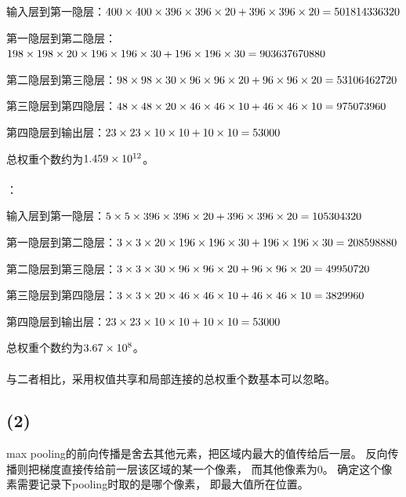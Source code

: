 \documentclass{article}
\renewcommand{\part}[1]{\subsection*{(#1)}}
\begin{document}
输入层到第一隐层：${\rm{400}} \times {\rm{400}} \times {\rm{396}} \times {\rm{396}} \times {\rm{20 + 396}} \times {\rm{396}} \times {\rm{20 = 501814336320}}$

第一隐层到第二隐层：${\rm{198}} \times {\rm{198}} \times {\rm{20}} \times {\rm{196}} \times {\rm{196}} \times {\rm{30 + 196}} \times {\rm{196}} \times {\rm{30 = 903637670880}}$

第二隐层到第三隐层：${\rm{98}} \times {\rm{98}} \times {\rm{30}} \times {\rm{96}} \times {\rm{96}} \times {\rm{20 + 96}} \times {\rm{96}} \times {\rm{20 = 53106462720}}$

第三隐层到第四隐层：${\rm{48}} \times {\rm{48}} \times {\rm{20}} \times {\rm{46}} \times {\rm{46}} \times {\rm{10 + 46}} \times {\rm{46}} \times {\rm{10 = 975073960}}$

第四隐层到输出层：${\rm{23}} \times {\rm{23}} \times {\rm{10}} \times {\rm{10 + 10}} \times {\rm{10 = 53000}}$

总权重个数约为${\rm{1}}{\rm{.459}} \times {\rm{1}}{{\rm{0}}^{{\rm{12}}}}$。
\\\\
：

输入层到第一隐层：${\rm{5}} \times {\rm{5}} \times {\rm{396}} \times {\rm{396}} \times {\rm{20 + 396}} \times {\rm{396}} \times {\rm{20 = 105304320}}$

第一隐层到第二隐层：${\rm{3}} \times {\rm{3}} \times {\rm{20}} \times {\rm{196}} \times {\rm{196}} \times {\rm{30 + 196}} \times {\rm{196}} \times {\rm{30 = 208598880}}$

第二隐层到第三隐层：${\rm{3}} \times {\rm{3}} \times {\rm{30}} \times {\rm{96}} \times {\rm{96}} \times {\rm{20 + 96}} \times {\rm{96}} \times {\rm{20 = 49950720}}$

第三隐层到第四隐层：${\rm{3}} \times {\rm{3}} \times {\rm{20}} \times {\rm{46}} \times {\rm{46}} \times {\rm{10 + 46}} \times {\rm{46}} \times {\rm{10 = 3829960}}$

第四隐层到输出层：${\rm{23}} \times {\rm{23}} \times {\rm{10}} \times {\rm{10 + 10}} \times {\rm{10 = 53000}}$

总权重个数约为${\rm{3}}{\rm{.67}} \times {\rm{1}}{{\rm{0}}^{\rm{8}}}$。
\\\\
与二者相比，采用权值共享和局部连接的总权重个数基本可以忽略。

\part{2}
max pooling的前向传播是舍去其他元素，把区域内最大的值传给后一层。
反向传播则把梯度直接传给前一层该区域的某一个像素，
而其他像素为0。
确定这个像素需要记录下pooling时取的是哪个像素，
即最大值所在位置。
\end{document}
